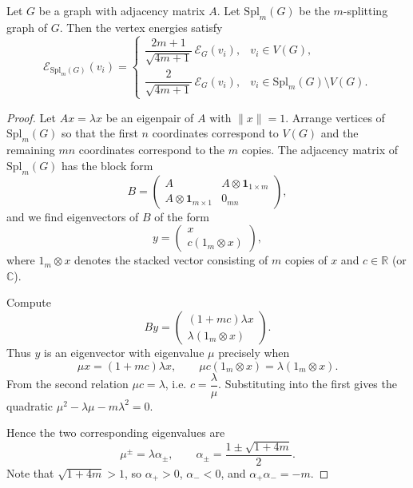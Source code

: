 \documentclass[10pt,a4paper]{amsart}
\begin{document}
\begin{theorem}\label{thm1}
	Let $G$ be a graph with adjacency matrix $A$. Let $\mathrm{Spl}_m(G)$ be the $m$-splitting graph of $G$. Then the vertex energies satisfy
	\[
	\mathcal{E}_{\mathrm{Spl}_m(G)}(v_i)=
	\begin{cases}
		\dfrac{2m+1}{\sqrt{4m+1}}\,\mathcal{E}_G(v_i), & v_i\in V(G),\\[8pt]
		\dfrac{2}{\sqrt{4m+1}}\,\mathcal{E}_G(v_i), & v_i\in \mathrm{Spl}_m(G)\setminus V(G).
	\end{cases}
	\]
\end{theorem}

\begin{proof}
	Let $A x=\lambda x$ be an eigenpair of $A$ with $\|x\|=1$. Arrange vertices of $\mathrm{Spl}_m(G)$ so that the first $n$ coordinates correspond to $V(G)$ and the remaining $mn$ coordinates correspond to the $m$ copies. The adjacency matrix of $\mathrm{Spl}_m(G)$ has the block form
	$$B=\begin{pmatrix}
		A & A\otimes \mathbf{1}_{1\times m}\\[4pt]
		A\otimes \mathbf{1}_{m\times 1} & 0_{mn}
	\end{pmatrix},$$
	and we find eigenvectors of $B$ of the form
	$$y=\begin{pmatrix}
		x \\ c(1_m\otimes x)
	\end{pmatrix},$$
	where $1_m\otimes x$ denotes the stacked vector consisting of $m$ copies of $x$ and $c\in\mathbb{R}$ (or $\mathbb{C}$).
	
	Compute
	$$B y
	=
	\begin{pmatrix}
		(1+m c)\lambda x \\[4pt]
		\lambda(1_m\otimes x)
	\end{pmatrix}.$$
	Thus $y$ is an eigenvector with eigenvalue $\mu$ precisely when
	$$\mu x=(1+m c)\lambda x,\qquad \mu c(1_m\otimes x)=\lambda(1_m\otimes x).$$
	From the second relation $\mu c=\lambda$, i.e. $c=\dfrac{\lambda}{\mu}$. Substituting into the first gives the quadratic
	$\mu^2-\lambda\mu-m\lambda^2=0.$
	
	Hence the two corresponding eigenvalues are
	$$\mu^\pm=\lambda\alpha_\pm,\qquad \alpha_\pm=\frac{1\pm\sqrt{1+4m}}{2}.$$
	Note that $\sqrt{1+4m}>1$, so $\alpha_+>0$, $\alpha_-<0$, and $\alpha_+\alpha_-=-m$.
	

\end{proof}
\end{document}
